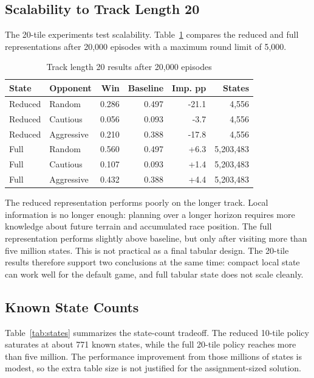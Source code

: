 \documentclass[conference]{IEEEtran}
\begin{document}
\subsection{Scalability to Track Length 20}

The 20-tile experiments test scalability. Table~\ref{tab:l20} compares the reduced
and full representations after 20,000 episodes with a maximum round limit of 5,000.

\begin{table}[h]
\centering
\caption{Track length 20 results after 20,000 episodes}
\label{tab:l20}
\begin{tabular}{llrrrr}
\toprule
State & Opponent & Win & Baseline & Imp. pp & States \\
\midrule
Reduced & Random & 0.286 & 0.497 & -21.1 & 4,556 \\
Reduced & Cautious & 0.056 & 0.093 & -3.7 & 4,556 \\
Reduced & Aggressive & 0.210 & 0.388 & -17.8 & 4,556 \\
Full & Random & 0.560 & 0.497 & +6.3 & 5,203,483 \\
Full & Cautious & 0.107 & 0.093 & +1.4 & 5,203,483 \\
Full & Aggressive & 0.432 & 0.388 & +4.4 & 5,203,483 \\
\bottomrule
\end{tabular}
\end{table}

The reduced representation performs poorly on the longer track. Local information
is no longer enough: planning over a longer horizon requires more knowledge about
future terrain and accumulated race position. The full representation performs
slightly above baseline, but only after visiting more than five million states.
This is not practical as a final tabular design. The 20-tile results therefore
support two conclusions at the same time: compact local state can work well for the
default game, and full tabular state does not scale cleanly.

\subsection{Known State Counts}

Table~\ref{tab:states} summarizes the state-count tradeoff. The reduced 10-tile
policy saturates at about 771 known states, while the full 20-tile policy reaches
more than five million. The performance improvement from those millions of states
is modest, so the extra table size is not justified for the assignment-sized
solution.
\end{document}
